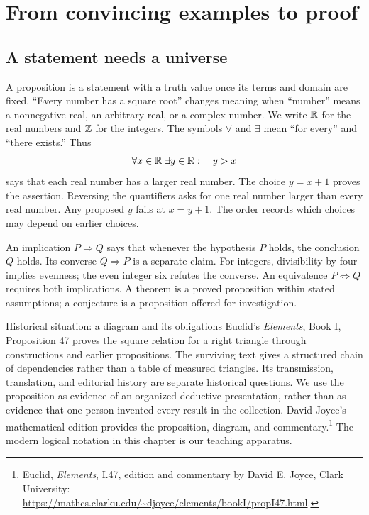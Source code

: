\chapter{From convincing examples to proof}
\label{learn:proof}





\section{A statement needs a universe}
A proposition is a statement with a truth value once its terms and domain are
fixed. ``Every number has a square root'' changes meaning when ``number''
means a nonnegative real, an arbitrary real, or a complex number. We write
$\mathbb{R}$ for the real numbers and $\mathbb{Z}$ for the integers. The symbols
$\forall$ and $\exists$ mean ``for every'' and ``there exists.'' Thus
\[
 \forall x\in\mathbb{R}\;\exists y\in\mathbb{R}:\quad y>x
\]
says that each real number has a larger real number. The choice $y=x+1$
proves the assertion. Reversing the quantifiers asks for one real number
larger than every real number. Any proposed $y$ fails at $x=y+1$.
The order records which choices may depend on earlier choices.

An implication $P\Rightarrow Q$ says that whenever the hypothesis $P$ holds,
the conclusion $Q$ holds. Its converse $Q\Rightarrow P$ is a separate claim.
For integers, divisibility by four implies evenness; the even integer six
refutes the converse. An equivalence $P\Leftrightarrow Q$ requires both
implications. A theorem is a proved proposition within stated assumptions;
a conjecture is a proposition offered for investigation.

\begin{learningcard}[breakable=false]{Historical situation: a diagram and its obligations}
Euclid's \emph{Elements}, Book I, Proposition 47 proves the square relation
for a right triangle through constructions and earlier propositions. The
surviving text gives a structured chain of dependencies rather than a table
of measured triangles. Its transmission, translation, and editorial history
are separate historical questions. We use the proposition as evidence of
an organized deductive presentation, rather than as evidence that one person
invented every result in the collection. David Joyce's mathematical edition
provides the proposition, diagram, and commentary.\footnote{Euclid,
\emph{Elements}, I.47, edition and commentary by David E. Joyce, Clark
University: \url{https://mathcs.clarku.edu/~djoyce/elements/bookI/propI47.html}.}
The modern logical notation in this chapter is our teaching apparatus.
\end{learningcard}

